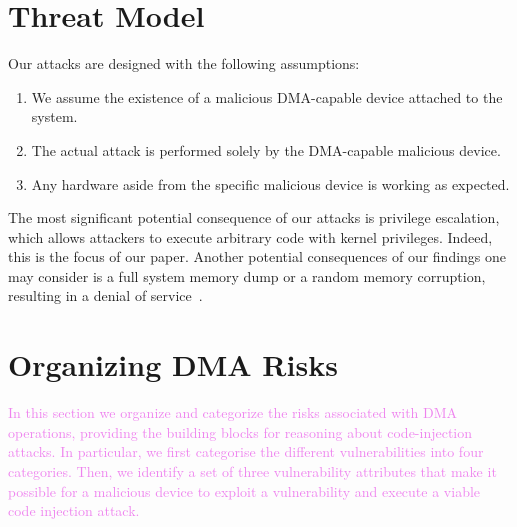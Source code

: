 \section{Threat Model}\label{sec:threat_model}

Our attacks are designed with the following assumptions:
\begin{enumerate}
    \item We assume the existence of a malicious DMA-capable device attached to the system.
    \item The actual attack is performed solely by the DMA-capable malicious device.
    \item Any hardware aside from the specific malicious device is working as expected.
 \end{enumerate}

The most significant potential consequence of our attacks is privilege escalation, which allows attackers to execute arbitrary code with kernel privileges. Indeed, this is the focus of our paper. 
%
Another potential consequences of our findings one may consider is a full system memory dump
or a random memory corruption, resulting in a denial of service~\cite{MMT16}. 

\section{Organizing DMA Risks}\label{sec:dma-risks}
\textcolor{violet}{In this section we organize and categorize the risks associated with DMA operations, providing the building blocks for reasoning about code-injection attacks.
In particular, we first categorise the different \subpage{} vulnerabilities into four categories.
Then, we identify a set of three vulnerability attributes that make it possible for a malicious device to exploit a \subpage{} vulnerability and execute a viable code injection attack.}

